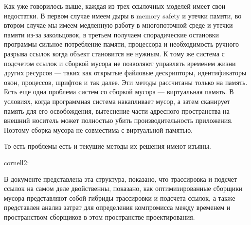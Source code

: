 Как уже говорилось выше, каждая из трех ссылочных моделей имеет свои недостатки. В первом случае имеем дыры в memory safety и  утечки памяти, во втором случае мы имеем медленную работу в многопоточной среде и утечки памяти из-за закольцовок, в третьем получаем спорадические остановки программы сильное потребление памяти, процессора и необходимость ручного разрыва ссылок когда объект становится не нужным. К тому же система с подсчетом ссылок и сборкой мусора не позволяют управлять временем жизни других ресурсов — таких как открытые файловые дескрипторы, идентификаторы окон, процессов, шрифтов и так далее. Эти методы рассчитаны только на память. Есть еще одна проблема систем со сборкой мусора — виртуальная память. В условиях, когда программная система накапливает мусор, а затем сканирует память для его освобождения, вытеснение части адресного пространства на внешний носитель может полностью убить производительность приложения. Поэтому сборка мусора не совместима с виртуальной памятью.

То есть проблемы есть и текущие методы их решения имеют изъяны.



cornell2:

В документе представлена ​​эта структура, показано, что трассировка и подсчет ссылок на самом деле двойственны, показано, как оптимизированные сборщики мусора представляют собой гибриды трассировки и подсчета ссылок, а также представлен анализ затрат для определения компромисса между временем и пространством сборщиков в этом пространстве проектирования.